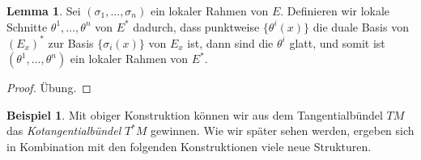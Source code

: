 \documentclass[a4paper]{scrreprt}
\numberwithin{equation}{chapter}
\theoremstyle{definition}
\newtheorem{lemma}[defn]{Lemma}
\newtheorem{bsp}[defn]{Beispiel}
\newcommand{\bewUeb}{\begin{proof}Übung.\end{proof}}
\begin{document}
		\begin{lemma} \label{lemma:rahmen_dual}
			Sei $(\sigma_1,\dots,\sigma_n)$ ein lokaler Rahmen von $E$. Definieren wir lokale Schnitte $\theta^1, \dots, \theta^n$ von $E^*$ dadurch, dass punktweise $\{\theta^i(x)\}$ die duale Basis von $(E_x)^*$ zur Basis $\{\sigma_i(x)\}$ von $E_x$ ist, dann sind die $\theta^i$ glatt, und somit ist $(\theta^1,\dots,\theta^n)$ ein lokaler Rahmen von $E^*$.
			\bewUeb
		\end{lemma}
		\begin{bsp}
			Mit obiger Konstruktion können wir aus dem Tangentialbündel $TM$ das \emph{Kotangentialbündel} $T^*M$ gewinnen. Wie wir später sehen werden, ergeben sich in Kombination mit den folgenden Konstruktionen viele neue Strukturen.
		\end{bsp}
		
\end{document}
